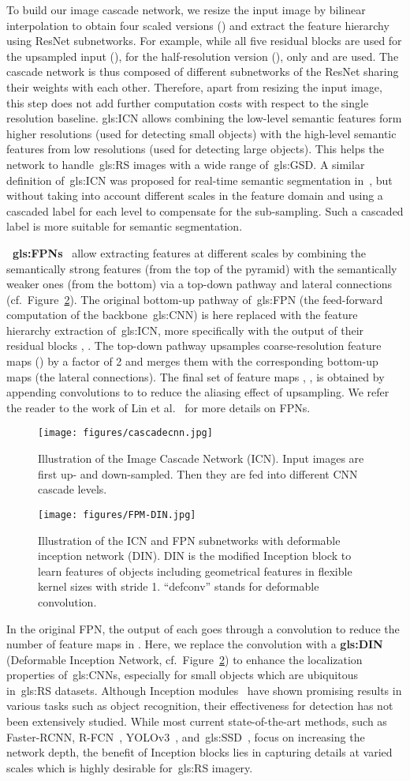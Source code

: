 \documentclass[runningheads]{llncs}
\newcommand{\cascadefigure}{
	\begin{figure}[t]
		\centering
		\texttt{[image: figures/cascadecnn.jpg]}
		\caption{Illustration of the Image Cascade Network (ICN). Input images are first up- and down-sampled. Then they are fed into different CNN cascade levels.}
        \label{fig:icn}
	\end{figure}
 }
\newcommand{\fpmidnfigure}{
  	\begin{figure}[h]
		\centering
		\texttt{[image: figures/FPM-DIN.jpg]}
		\caption{Illustration of the ICN and FPN subnetworks with deformable inception network (DIN). DIN is the modified Inception block to learn features of objects including geometrical features in flexible kernel sizes with stride 1. ``defconv'' stands for deformable convolution.}
        \label{fig:FPN}
	\end{figure}
}
\begin{document}
	To build our image cascade network, we resize the input image by bilinear interpolation to obtain four scaled versions () and extract the feature hierarchy using ResNet subnetworks. For example, while all five residual blocks are used for the upsampled input (), for the half-resolution version (), only  and  are used.
	The cascade network is thus composed of different subnetworks of the ResNet sharing their weights with each other.
	Therefore, apart from resizing the input image, this step does not add further computation costs with respect to the single resolution baseline. \gls{gls:ICN} allows combining the low-level semantic features form higher resolutions (used for detecting small objects) with the high-level semantic features from low resolutions (used for detecting large objects).
    This helps the network to handle~\gls{gls:RS} images with a wide range of~\gls{gls:GSD}.
    A similar definition of~\gls{gls:ICN} was proposed for real-time semantic segmentation in~\cite{zhao2017icnet}, but without taking into account different scales in the feature domain and using a cascaded label for each level to compensate for the sub-sampling.
    Such a cascaded label is more suitable for semantic segmentation.
	
	\textbf{~\glspl{gls:FPN}}~\cite{fpn} allow extracting features at different scales by combining the semantically strong features (from the top of the pyramid) with the semantically weaker ones (from the bottom) via a top-down pathway and lateral connections (cf.\ Figure~\ref{fig:FPN}).
    The original bottom-up pathway of~\gls{gls:FPN} (\ie the feed-forward computation of the backbone~\gls{gls:CNN}) is here replaced with the feature hierarchy extraction of~\gls{gls:ICN}, more specifically with the output of their residual blocks , .
    The top-down pathway upsamples coarse-resolution feature maps () by a factor of 2 and merges them with the corresponding bottom-up maps  (\ie the lateral connections).
    The final set of feature maps , , is obtained by appending  convolutions to  to reduce the aliasing effect of upsampling.
    We refer the reader to the work of Lin et al.~\cite{fpn} for more details on FPNs.
\cascadefigure
\fpmidnfigure
In the original FPN, the output of each  goes through a  convolution to reduce the number of feature maps in .    
Here, we replace the  convolution with a \textbf{\gls{gls:DIN}} (Deformable Inception Network, cf.\ Figure~\ref{fig:FPN}) to enhance the localization properties of~\glspl{gls:CNN}, especially for small objects which are ubiquitous in~\gls{gls:RS} datasets.
Although Inception modules~\cite{inception} have shown promising results in various tasks such as object recognition, their effectiveness for  detection has not been extensively studied. 
While most current state-of-the-art methods, such as Faster-RCNN, R-FCN~\cite{NIPS2016_6465}, YOLOv3~\cite{redmon2017yolo9000}, and~\gls{gls:SSD}~\cite{DBLP:conf/eccv/LiuAESRFB16}, focus on increasing the network depth, the benefit of Inception blocks lies in capturing details at varied scales which is highly desirable for~\gls{gls:RS} imagery.
\end{document}
